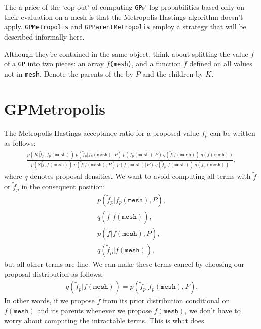 The a price of the `cop-out' of computing \texttt{GP}s' log-probabilities based only on their evaluation on a mesh is that the Metropolis-Hastings algorithm doesn't apply. \texttt{GPMetropolis} and \texttt{GPParentMetropolis} employ a strategy that will be described informally here.

Although they're contained in the same object, think about splitting the value $f$ of a \texttt{GP} into two pieces: an array $f$\texttt{(mesh)}, and a function $\tilde f$ defined on all values not in \texttt{mesh}. Denote the parents of the  by $P$ and the children by $K$.

\section{GPMetropolis}
The Metropolis-Hastings acceptance ratio for a proposed value $f_p$ can be written as follows:
\begin{eqnarray*}
    \frac{p(K|\tilde f_p, f_p(\mathtt{mesh}))\ p(\tilde f_p|f_p(\mathtt{mesh}), P)\ p(f_p(\mathtt{mesh}) | P)\ q(\tilde f|f(\mathtt{mesh}))\ q(f(\mathtt{mesh}))}{p(\mathtt{K}|\tilde f, f(\mathtt{mesh}))\ p(\tilde f|f(\mathtt{mesh}), P)\ p(f(\mathtt{mesh}) | P)\ q(\tilde f_p|f(\mathtt{mesh}))\ q(f_p(\mathtt{mesh}))},
\end{eqnarray*}
where $q$ denotes proposal densities. We want to avoid computing all terms with $\tilde f$ or $\tilde f_p$ in the consequent position:
\begin{eqnarray*}
    p(\tilde f_p|f_p(\texttt{mesh}), P),\\ q(\tilde f|f(\texttt{mesh})),\\ p(\tilde f|f(\texttt{mesh}), P),\\ q(\tilde f_p|f(\texttt{mesh})),
\end{eqnarray*}
but all other terms are fine. We can make these terms cancel by choosing our proposal distribution as follows:
\begin{eqnarray*}
    q(\tilde f_p|f(\texttt{mesh})) = p(\tilde f_p|f_p(\texttt{mesh}), P).
\end{eqnarray*}
In other words, if we propose $\tilde f$ from its prior distribution conditional on $f(\texttt{mesh})$ and its parents whenever we propose $f(\texttt{mesh})$, we don't have to worry about computing the intractable terms. This is what  does.

